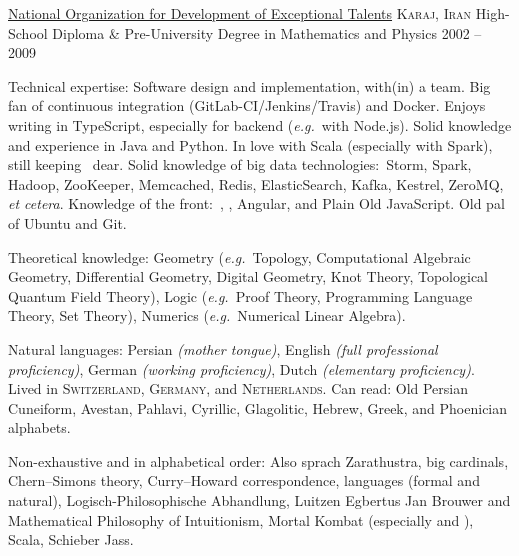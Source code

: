 \documentclass[10pt,a4paper]{article}
\begin{document}
\headedsection
  {\href{https://en.wikipedia.org/wiki/National_Organization_for_Development_of_Exceptional_Talents}{National Organization for Development of Exceptional Talents}}
  {\textsc{Karaj, Iran}} {%
  \headedsubsection
    {High-School Diploma \& Pre-University Degree in Mathematics and Physics}
    {2002 -- 2009} {}
}


\spacedhrule{0.5em}{-0.4em}


\inlineheadsection  %
  {Technical expertise:}
  {Software design and implementation, with(in) a team.  Big fan of continuous integration (GitLab-CI/Jenkins/Travis) and Docker.  Enjoys writing in TypeScript, especially for backend (\textit{e.g.}\ with Node.js). Solid knowledge and experience in Java and Python. In love with Scala (especially with Spark), still keeping \CPP\ dear. Solid knowledge of big data technologies:\ Storm, Spark, Hadoop, ZooKeeper, Memcached, Redis, ElasticSearch, Kafka, Kestrel, ZeroMQ, \textit{et cetera}. Knowledge of the front:\ , , Angular, and Plain Old JavaScript. Old pal of Ubuntu and Git.}

\vspace{0.5em}
\inlineheadsection
  {Theoretical knowledge:}
  {Geometry (\textit{e.g.}~Topology, Computational Algebraic Geometry, Differential Geometry, Digital Geometry, Knot Theory, Topological Quantum Field Theory), Logic (\textit{e.g.}~Proof Theory, Programming Language Theory, Set Theory), Numerics (\textit{e.g.}~Numerical Linear Algebra).}
  
\vspace{0.5em}
\inlineheadsection
  {Natural languages:}
  {Persian \emph{(mother tongue)}, English \emph{(full professional proficiency)}, German \emph{(working proficiency)}, Dutch \emph{(elementary proficiency)}. Lived in \textsc{Switzerland}, \textsc{Germany}, and \textsc{Netherlands}. Can read: Old Persian Cuneiform, Avestan, Pahlavi, Cyrillic, Glagolitic, Hebrew, Greek, and Phoenician alphabets.}


\spacedhrule{1.6em}{-0.4em}


\inlineheadsection
  {Non-exhaustive and in alphabetical order:}
  {Also sprach Zarathustra, big cardinals, Chern--Simons theory, Curry--Howard correspondence, languages (formal and natural), Logisch-Philosophische Abhandlung, Luitzen Egbertus Jan Brouwer and Mathematical Philosophy of Intuitionism, Mortal Kombat (especially  and ), Scala, Schieber Jass.}
\end{document}
